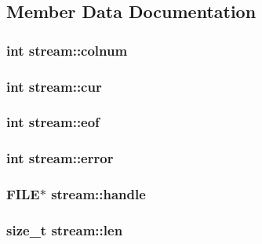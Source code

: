 \subsection{Member Data Documentation}
\hypertarget{structstream_a3c721e76d56847595996ac2ccfe6076b}{
\subsubsection[{colnum}]{\setlength{\rightskip}{0pt plus 5cm}int stream\-::colnum}}\label{structstream_a3c721e76d56847595996ac2ccfe6076b}
\hypertarget{structstream_a18ac9c9f561a60391e5c98f6154c76b6}{
\subsubsection[{cur}]{\setlength{\rightskip}{0pt plus 5cm}int stream\-::cur}}\label{structstream_a18ac9c9f561a60391e5c98f6154c76b6}
\hypertarget{structstream_a51143a5c7659b6cb3aac7aad3122959b}{
\subsubsection[{eof}]{\setlength{\rightskip}{0pt plus 5cm}int stream\-::eof}}\label{structstream_a51143a5c7659b6cb3aac7aad3122959b}
\hypertarget{structstream_aab0ed409766d54ed2852649280ec9853}{
\subsubsection[{error}]{\setlength{\rightskip}{0pt plus 5cm}int stream\-::error}}\label{structstream_aab0ed409766d54ed2852649280ec9853}
\hypertarget{structstream_a7a2bb1163cc84edef1678666ff146c9e}{
\subsubsection[{handle}]{\setlength{\rightskip}{0pt plus 5cm}F\-I\-L\-E$\ast$ stream\-::handle}}\label{structstream_a7a2bb1163cc84edef1678666ff146c9e}
\hypertarget{structstream_a7c33eff34c7940579b6beae16ac97274}{
\subsubsection[{len}]{\setlength{\rightskip}{0pt plus 5cm}size\-\_\-t stream\-::len}}\label{structstream_a7c33eff34c7940579b6beae16ac97274}
